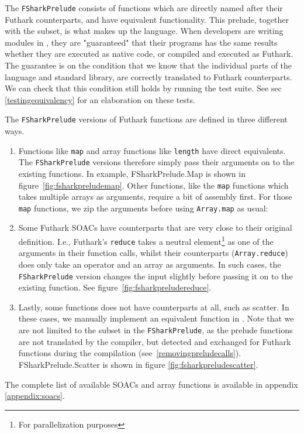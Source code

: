 The \texttt{FSharkPrelude} consists of functions which are directly named after
their Futhark counterparts, and have equivalent functionality.
This prelude, together with the \fshark{} subset, is what makes up the \fshark{} language.
When \fshark{} developers are writing modules in \fshark{}, they are "guaranteed"
that their \fshark{} programs has the same results whether they are executed as
native \fsharp{} code, or compiled and executed as Futhark. 
The guarantee is on the condition that we know that the
individual parts of the \fshark{} language and standard library,  are correctly
translated to Futhark counterparts.
We can check that this condition still holds by running the \fshark{} test
suite. See sec \ref{testingequivalency} for an elaboration on these tests.



The \texttt{FSharkPrelude} versions of Futhark functions are defined in three
different ways.
\begin{enumerate}
  \item Functions like \texttt{map} and array functions like
    \texttt{length} have direct \fsharp{} equivalents. The
    \texttt{FSharkPrelude} versions therefore simply pass their arguments on to
    the existing functions. In example, FSharkPrelude.Map is shown in 
    figure~\ref{fig:fsharkpreludemap}.
    Other functions, like the \texttt{map} functions which takes multiple arrays as
    arguments, require a bit of assembly first. For those \texttt{map} functions,
    we zip the arguments before using \texttt{Array.map} as usual:

  \item Some Futhark SOACs have \fsharp{} counterparts that are very close to
    their original definition.
    I.e., Futhark's \texttt{reduce} takes a neutral element\footnote{For
      parallelization purposes} as one of the
    arguments in their function calls, whilst their \fsharp{} counterparts
    (\texttt{Array.reduce}) does only take an operator and an array as
    arguments.
    In such cases, the \texttt{FSharkPrelude} version changes the input slightly
    before passing it on to the existing function. See figure~\ref{fig:fsharkpreludereduce}.

  \item Lastly, some functions does not have \fsharp{} counterparts at all, such
    as scatter. In these cases, we manually implement an equivalent function in
    \fsharp{}.
    Note that we are not limited to the \fshark{} subset in the
    \texttt{FSharkPrelude}, as the prelude functions are not translated by the
    \fshark{} compiler, but detected and exchanged for
    Futhark functions during the \fshark{} compilation (see~\ref{removingpreludecalls}).
    FSharkPrelude.Scatter is shown in figure \ref{fig:fsharkpreludescatter}.

\end{enumerate}
The complete list of available SOACs and array functions is available in
appendix \ref{appendix:soacs}.

